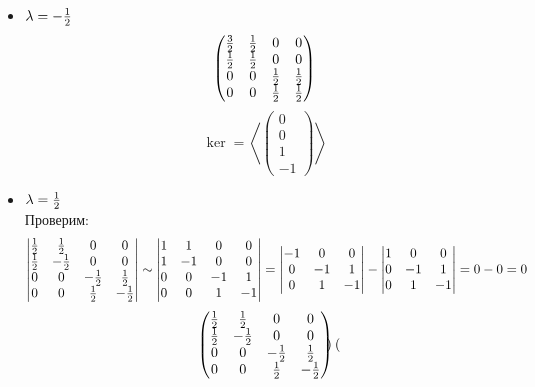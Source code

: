 \begin{itemize}
	\item $ \lambda = -\half $
    $$
    \begin{pmatrix}
    	\half[3] & \half & 0 & 0 \\
        \half & \half & 0 & 0 \\
        0 & 0 & \half & \half \\
        0 & 0 & \half & \half
    \end{pmatrix} $$
    $$ \ker = \left\langle
    \begin{pmatrix}
    	0 \\
        0 \\
        1 \\
        -1
    \end{pmatrix} \right\rangle $$
    \item $ \lambda = \half $ \\
    Проверим:
    $$
    \begin{vmatrix}
    	\half & \half & 0 & 0 \\
        \half & -\half & 0 & 0 \\
        0 & 0 & -\half & \half \\
        0 & 0 & \half & -\half
    \end{vmatrix} \sim
    \begin{vmatrix}
    	1 & 1 & 0 & 0 \\
        1 & -1 & 0 & 0 \\
        0 & 0 & -1 & 1 \\
        0 & 0 & 1 & -1
    \end{vmatrix} =
    \begin{vmatrix}
    	-1 & 0 & 0 \\
        0 & -1 & 1 \\
        0 & 1 & -1
    \end{vmatrix} -
    \begin{vmatrix}
    	1 & 0 & 0 \\
        0 & -1 & 1 \\
        0 & 1 & -1
    \end{vmatrix} = 0 - 0 = 0 $$
    $$
    \begin{pmatrix}
    	\half & \half & 0 & 0 \\
        \half & -\half & 0 & 0 \\
        0 & 0 & -\half & \half \\
        0 & 0 & \half & -\half
    \end{pmatrix}
    \begin{pmatrix}

\end{pmatrix}$$
\end{itemize}
